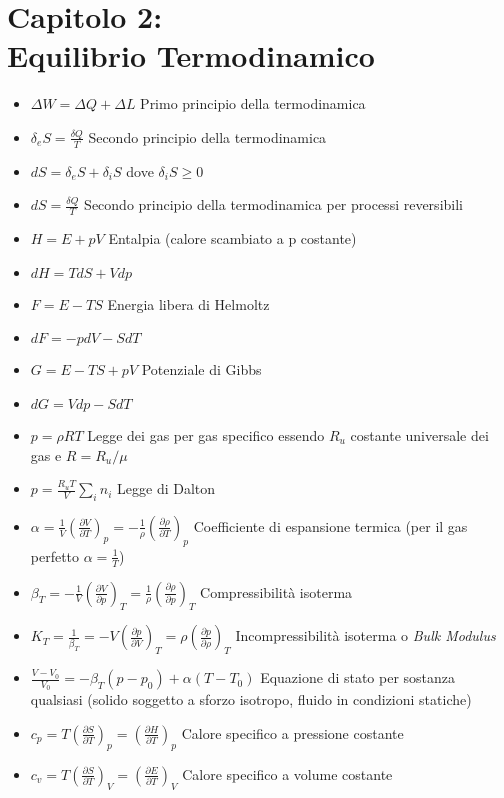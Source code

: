 \documentclass[a4paper]{article}
\begin{document}
\section{Capitolo 2:\\ Equilibrio Termodinamico}
\begin{itemize}
	\item $\Delta W = \Delta Q + \Delta L$ Primo principio della termodinamica
	\item $\delta_e S = \frac{\delta Q}{T}$ Secondo principio della termodinamica
	\item $dS = \delta_e S + \delta_i S$ dove $\delta_i S \geq 0 $
	\item $ dS = \frac{\delta Q}{T}$ Secondo principio della termodinamica per processi reversibili
	\item $H=E+pV$ Entalpia (calore scambiato a p costante)
	\item $dH=TdS+Vdp$
	\item $F=E-TS$ Energia libera di Helmoltz
	\item $dF=-pdV-SdT$
	\item $G=E-TS+pV$ Potenziale di Gibbs
	\item $dG=Vdp-SdT$
	\item $p=\rho R T$ Legge dei gas per gas specifico essendo $R_u$ costante universale dei gas e $R= R_u / \mu$
	\item $p = \frac{R_u T}{V}\sum_{i}^{}n_i$ Legge di Dalton
	\item $\alpha = \frac{1}{V}(\frac{\partial V}{\partial T})_p = -\frac{1}{\rho}(\frac{\partial \rho}{\partial T})_p$ Coefficiente di espansione termica (per il gas perfetto $\alpha = \frac{1}{T}$)
	\item $\beta_T=-\frac{1}{V}(\frac{\partial V}{\partial p})_T=\frac{1}{\rho}(\frac{\partial \rho}{\partial p})_T $ Compressibilità isoterma
	\item $K_T=\frac{1}{\beta_T}=-V(\frac{\partial p}{\partial V})_T=\rho (\frac{\partial p}{\partial \rho})_T$ Incompressibilità isoterma o \textit{Bulk Modulus}
	\item $ \frac{V-V_0}{V_0} = -\beta_T (p-p_0)+\alpha(T-T_0) $ Equazione di stato per sostanza qualsiasi (solido soggetto a sforzo isotropo, fluido in condizioni statiche)
	\item $c_p=T(\frac{\partial S}{\partial T})_p = (\frac{\partial H}{\partial T})_p$ Calore specifico a pressione costante
	\item $c_v=T(\frac{\partial S}{\partial T})_V = (\frac{\partial E}{\partial T})_V$ Calore specifico a volume costante

\end{itemize}
\end{document}
